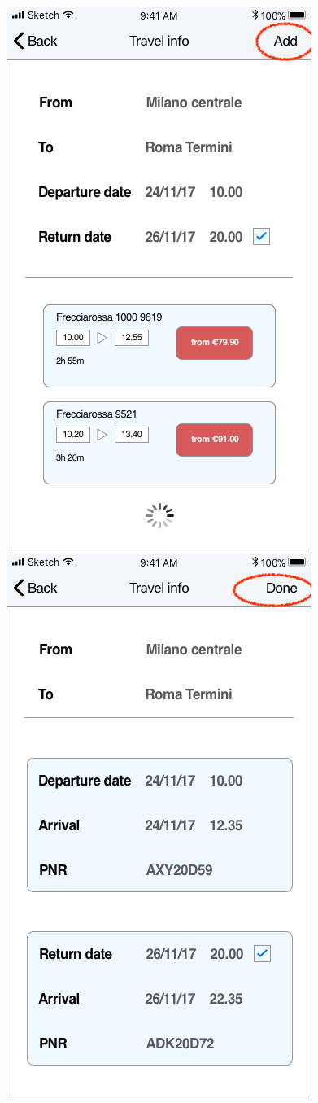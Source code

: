 \begin{figure}[H]
	\includegraphics[scale=0.23]{Images/Interface/Trips/8_trip_add_button}
	\hspace{0.5cm}
	\includegraphics[scale=0.23]{Images/Interface/Trips/9_form}

\end{figure}
